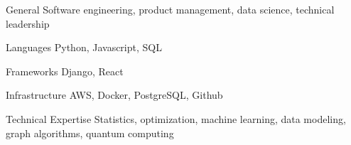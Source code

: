 

\begin{cvskills}
  \cvskill
    {General}
    {Software engineering, product management, data science, technical leadership}

  \cvskill
    {Languages}
    {Python, Javascript, SQL}

  \cvskill
    {Frameworks}
    {Django, React}

  \cvskill
    {Infrastructure}
    {AWS, Docker, PostgreSQL, Github}

  \cvskill
    {Technical Expertise}
    {Statistics, optimization, machine learning, data modeling, graph algorithms, quantum computing}
\end{cvskills}
